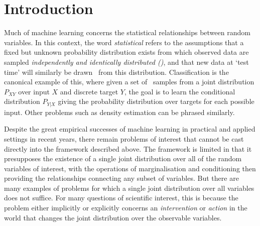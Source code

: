 

\section{Introduction}

Much of machine learning concerns the statistical relationships between random variables. In this context, the word \emph{statistical} refers to the assumptions that a fixed but unknown probability distribution exists from which observed data are sampled \emph{independently and identically distributed (\iid)}, and that new data at `test time' will similarly be drawn \iid~from this distribution.
Classification is the canonical example of this, where given a set of \iid~samples from a joint distribution $P_{XY}$ over input $X$ and discrete target $Y$, the goal is to learn the conditional distribution $P_{Y|X}$ giving the probability distribution over targets for each possible input. Other problems such as density estimation can be phrased similarly.

Despite the great empirical successes of machine learning in practical and applied settings in recent years, there remain problems of interest that cannot be cast directly into the framework described above. 
The framework is limited in that it presupposes the existence of a single joint distribution over all of the random variables of interest, with the operations of marginalisation and conditioning then providing the relationships connecting any subset of variables.
But there are many examples of problems for which a single joint distribution over all variables does not suffice. 
For many questions of scientific interest, this is because the problem either implicitly or explicitly concerns an \emph{intervention} or \emph{action} in the world that changes the joint distribution over the observable variables.

